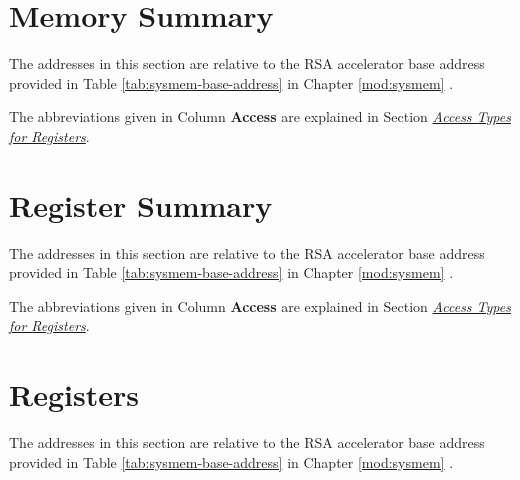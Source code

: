 \documentclass[main\_\_EN.tex]{subfiles}
\begin{document}
\section{Memory Summary}\label{sec:mem-sum}
The addresses in this section are relative to the RSA accelerator base address provided in Table \ref{tab:sysmem-base-address} in Chapter \ref{mod:sysmem} \textit{}.

The abbreviations given in Column \textbf{Access} are explained in Section \hyperref[glossary-access-types]{\textit{Access Types for Registers}}.




\clearpage
\hypertarget{rsa-reg-summ}{}
\section{Register Summary}
\label{sec:rsa-reg-summ}


The addresses in this section are relative to the RSA accelerator base address provided in Table \ref{tab:sysmem-base-address} in Chapter \ref{mod:sysmem} \textit{}.

The abbreviations given in Column \textbf{Access} are explained in Section \hyperref[glossary-access-types]{\textit{Access Types for Registers}}.





\clearpage
\section{Registers}

The addresses in this section are relative to the RSA accelerator base address provided in Table \ref{tab:sysmem-base-address} in Chapter \ref{mod:sysmem} \textit{}.


\end{document}
